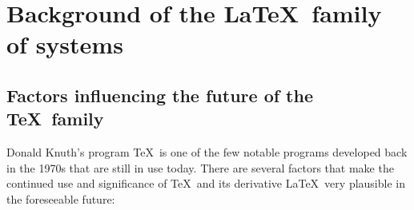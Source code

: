 \documentclass[sigconf]{acmart}
\newcommand{\ie}{i.e.,\ }
\begin{document}




\section{Background of the \LaTeX\ family of systems}\label{sect:background}

\subsection{Factors influencing the future of the  \TeX\ family}
Donald Knuth's program \TeX\ is one of the  few notable programs developed back in the 1970s that are still in use today. 
There are several factors that make the continued use and significance of \TeX\  and its derivative  \LaTeX\  very plausible in the foreseeable future: 
\end{document}
